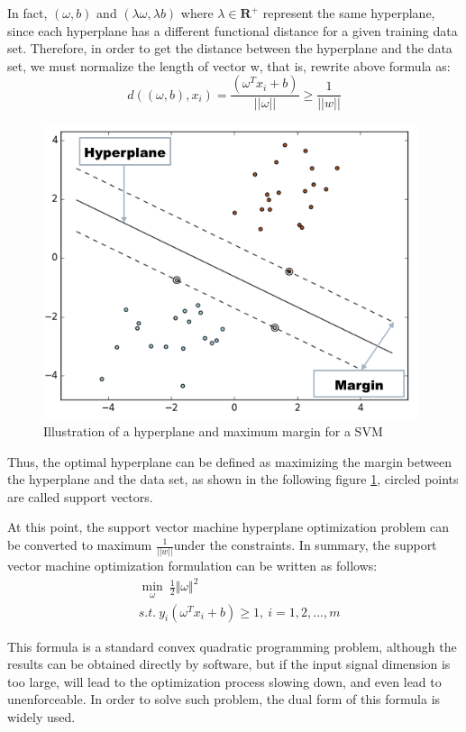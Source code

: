 \documentclass[master]{IPSstyle}
\begin{document}
In fact, $(\omega, b)$ and $(\lambda\omega, \lambda b)$ where $\lambda \in \mathbf{R}^+$ represent the same hyperplane, since each hyperplane has a different functional distance for a given training data set. Therefore, in order to get the distance between the hyperplane and the data set, we must normalize the length of vector w, that is, rewrite above formula as: 
\begin{equation}
d((\omega, b), x_i) = \frac{(\omega^T x_i + b)}{||\omega||} \geq \frac{1}{||w||}
\end{equation}
\begin{figure}[H]
  \centering
  \includegraphics[width=11cm]{figures/ch2_support_vectors.png}
  \caption{Illustration of a hyperplane and maximum margin for a SVM} \label{fg:SVs}
\end{figure}
Thus, the optimal hyperplane can be defined as maximizing the margin between the hyperplane and the data set, as shown in the following figure \ref{fg:SVs}, circled points are called support vectors.

At this point, the support vector machine hyperplane optimization problem can be converted to maximum $\frac{1}{||w||}$under the constraints. In summary, the support vector machine optimization formulation can be written as follows:
\begin{equation}\label{eq:2:SVM_Primal}
\begin{aligned}
&\min_{\omega}  ~ \frac{1}{2}\Vert\omega\Vert^2\\
&s.t. ~ y_i\left(\omega^Tx_i+b\right)\geq1, ~ i=1,2,...,m
\end{aligned}
\end{equation}

This formula is a standard convex quadratic programming problem, although the results can be obtained directly by software, but if the input signal dimension is too large, will lead to the optimization process slowing down, and even lead to unenforceable. In order to solve such problem, the dual form of this formula is widely used.
\end{document}
